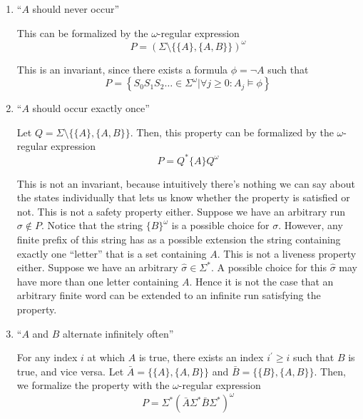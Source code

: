 \documentclass[letterpaper,11pt]{article}
\begin{document}
\begin{enumerate}
        \renewcommand{\labelenumi}{(\alph{enumi})}
    \item ``$A$ should never occur''

        This can be formalized by the $\omega$-regular expression
        \begin{equation*}
            P = (\Sigma \setminus \{ \{A\}, \{A, B\} \})^\omega
        \end{equation*}

        This is an invariant, since there exists a formula $\phi = \neg A$ such
        that
        \begin{equation*}
            P = \left\{
                S_0 S_1 S_2 \ldots \in \Sigma^\omega
                | \forall j \geq 0 : A_j \models \phi
            \right\}
        \end{equation*}

    \item ``$A$ should occur exactly once''

        Let $Q = \Sigma \setminus \{ \{A\}, \{A, B\} \}$. Then, this property
        can be formalized by the $\omega$-regular expression
        \begin{equation*}
            P = Q^* \{A\} Q^\omega
        \end{equation*}

        This is not an invariant, because intuitively there's nothing we can
        say about the states individually that lets us know whether the
        property is satisfied or not. This is not a safety property either.
        Suppose we have an arbitrary run $\sigma \notin P$. Notice that the
        string $\{B\}^\omega$ is a possible choice for $\sigma$. However, any
        finite prefix of this string has as a possible extension the string
        containing exactly one ``letter'' that is a set containing $A$. This is
        not a liveness property either. Suppose we have an arbitrary
        $\hat \sigma \in \Sigma^*$. A possible choice for this $\hat \sigma$
        may have more than one letter containing $A$. Hence it is not the case
        that an arbitrary finite word can be extended to an infinite run
        satisfying the property.

    \item ``$A$ and $B$ alternate infinitely often''

        For any index $i$ at which $A$ is true, there exists an index
        $i^\prime \geq i$ such that $B$ is true, and vice versa.
        Let $\bar A = \{ \{A\}, \{A, B\} \}$
        and $\bar B = \{ \{B\}, \{A, B\} \}$.
        Then, we formalize the property with the $\omega$-regular expression
        \begin{equation*}
            P = \Sigma^* (\bar A \Sigma^* \bar B \Sigma^*)^\omega
        \end{equation*}


\end{enumerate}
\end{document}
